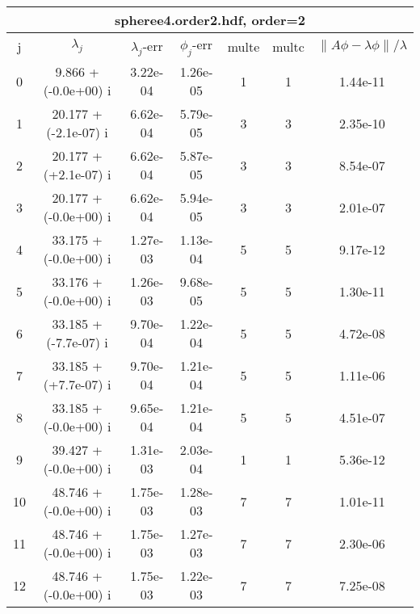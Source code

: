 \begin{table}[H]\tableFont %
\begin{center}
\begin{tabular}{|c|c|c|c|c|c|c|}  \hline
\multicolumn{7}{|c|}{spheree4.order2.hdf, order=2} \\ \hline
   j    &         $\lambda_j$        & $\lambda_j$-err  & $\phi_j$-err  & multe & multc & $\| A\phi - \lambda\phi\|/\lambda$     \\ \hline
     0  &      9.866 + (-0.0e+00) i  &    3.22e-04      &   1.26e-05    &   1    &  1   &    1.44e-11 \\
     1  &     20.177 + (-2.1e-07) i  &    6.62e-04      &   5.79e-05    &   3    &  3   &    2.35e-10 \\
     2  &     20.177 + (+2.1e-07) i  &    6.62e-04      &   5.87e-05    &   3    &  3   &    8.54e-07 \\
     3  &     20.177 + (-0.0e+00) i  &    6.62e-04      &   5.94e-05    &   3    &  3   &    2.01e-07 \\
     4  &     33.175 + (-0.0e+00) i  &    1.27e-03      &   1.13e-04    &   5    &  5   &    9.17e-12 \\
     5  &     33.176 + (-0.0e+00) i  &    1.26e-03      &   9.68e-05    &   5    &  5   &    1.30e-11 \\
     6  &     33.185 + (-7.7e-07) i  &    9.70e-04      &   1.22e-04    &   5    &  5   &    4.72e-08 \\
     7  &     33.185 + (+7.7e-07) i  &    9.70e-04      &   1.21e-04    &   5    &  5   &    1.11e-06 \\
     8  &     33.185 + (-0.0e+00) i  &    9.65e-04      &   1.21e-04    &   5    &  5   &    4.51e-07 \\
     9  &     39.427 + (-0.0e+00) i  &    1.31e-03      &   2.03e-04    &   1    &  1   &    5.36e-12 \\
    10  &     48.746 + (-0.0e+00) i  &    1.75e-03      &   1.28e-03    &   7    &  7   &    1.01e-11 \\
    11  &     48.746 + (-0.0e+00) i  &    1.75e-03      &   1.27e-03    &   7    &  7   &    2.30e-06 \\
    12  &     48.746 + (-0.0e+00) i  &    1.75e-03      &   1.22e-03    &   7    &  7   &    7.25e-08 \\

\end{tabular}
\end{center}
\end{table}
